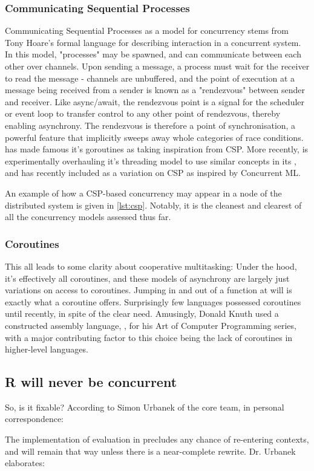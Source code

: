 \subsubsection{Communicating Sequential Processes}

Communicating Sequential Processes as a model for concurrency stems from Tony Hoare's formal language for describing interaction in a concurrent system\cite{hoare1978communicating}.
In this model, "processes" may be spawned, and can communicate between each other over channels.
Upon sending a message, a process must wait for the receiver to read the message - channels are unbuffered, and the point of execution at a message being received from a sender is known as a "rendezvous" between sender and receiver.
Like async/await, the rendezvous point is a signal for the scheduler or event loop to transfer control to any other point of rendezvous, thereby enabling asynchrony.
The rendezvous is therefore a point of synchronisation, a powerful feature that implicitly sweeps away whole categories of race conditions.
 has made famous it's goroutines as taking inspiration from CSP\cite{gomem2014}.
More recently,  is experimentally overhauling it's threading model to use similar concepts in its , and  has recently included  as a variation on CSP as inspired by Concurrent ML.

An example of how a CSP-based concurrency may appear in a node of the distributed system is given in \cref{lst:csp}.
Notably, it is the cleanest and clearest of all the concurrency models assessed thus far.


\subsubsection{Coroutines}

This all leads to some clarity about cooperative multitasking: Under the hood, it's effectively all coroutines, and these models of asynchrony are largely just variations on access to coroutines.
Jumping in and out of a function at will is exactly what a coroutine offers.
Surprisingly few languages possessed coroutines until recently, in spite of the clear need.
Amusingly, Donald Knuth used a constructed assembly language, , for his Art of Computer Programming series, with a major contributing factor to this choice being the lack of coroutines in higher-level languages\cite{knuth1}.

\subsection{R will never be concurrent}\label{sec:no}

So, is it fixable?
According to Simon Urbanek of the \R core team, in personal correspondence:


The implementation of evaluation in \R precludes any chance of re-entering contexts, and will remain that way unless there is a near-complete rewrite. Dr. Urbanek elaborates:

